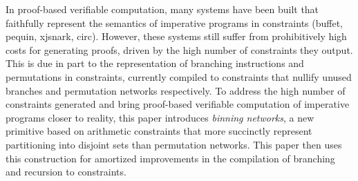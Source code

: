 In proof-based verifiable computation, many systems have been built that faithfully represent the semantics of imperative programs in constraints (buffet, pequin, xjsnark, circ).
However, these systems still suffer from prohibitively high costs for generating proofs, driven by the high number of constraints they output.
This is due in part to the representation of branching instructions and permutations in constraints, currently compiled to constraints that nullify unused branches and permutation networks respectively.
To address the high number of constraints generated and bring proof-based verifiable computation of imperative programs closer to reality, this paper introduces \textit{binning networks},
a new primitive based on arithmetic constraints that more succinctly represent partitioning into disjoint sets than permutation networks. This paper then uses this construction
for amortized improvements in the compilation of branching and recursion to constraints.